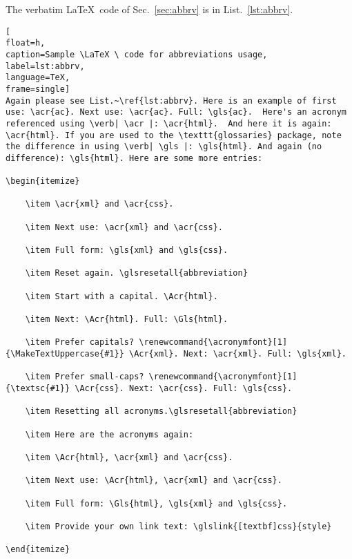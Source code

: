The verbatim \LaTeX \ code of Sec.~\ref{sec:abbrv} is in List.~\ref{lst:abbrv}.

\begin{lstlisting}[
float=h,
caption=Sample \LaTeX \ code for abbreviations usage, 
label=lst:abbrv,
language=TeX,
frame=single]
Again please see List.~\ref{lst:abbrv}. Here is an example of first use: \acr{ac}. Next use: \acr{ac}. Full: \gls{ac}.  Here's an acronym referenced using \verb| \acr |: \acr{html}.  And here it is again: \acr{html}. If you are used to the \texttt{glossaries} package, note the difference in using \verb| \gls |: \gls{html}. And again (no difference): \gls{html}. Here are some more entries:

\begin{itemize}

	\item \acr{xml} and \acr{css}.

	\item Next use: \acr{xml} and \acr{css}.

	\item Full form: \gls{xml} and \gls{css}.

	\item Reset again. \glsresetall{abbreviation}

	\item Start with a capital. \Acr{html}.

	\item Next: \Acr{html}. Full: \Gls{html}.

	\item Prefer capitals? \renewcommand{\acronymfont}[1]{\MakeTextUppercase{#1}} \Acr{xml}. Next: \acr{xml}. Full: \gls{xml}.

	\item Prefer small-caps? \renewcommand{\acronymfont}[1]{\textsc{#1}} \Acr{css}. Next: \acr{css}. Full: \gls{css}.

	\item Resetting all acronyms.\glsresetall{abbreviation}

	\item Here are the acronyms again:

	\item \Acr{html}, \acr{xml} and \acr{css}.

	\item Next use: \Acr{html}, \acr{xml} and \acr{css}.

	\item Full form: \Gls{html}, \gls{xml} and \gls{css}.

	\item Provide your own link text: \glslink{[textbf]css}{style} 
	
\end{itemize}
\end{lstlisting}
\cleardoublepage






